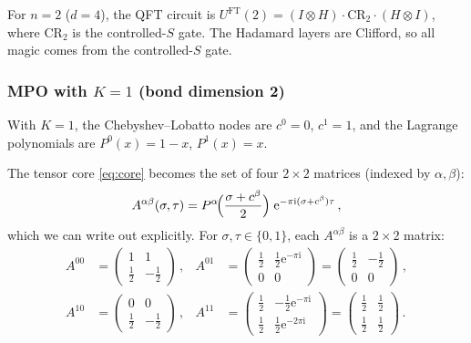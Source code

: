 \documentclass[11pt,a4paper]{article}
\theoremstyle{definition}
\theoremstyle{remark}
\newcommand{\UFT}{U^{\mathrm{FT}}}
\newcommand{\ee}{\mathrm{e}}
\newcommand{\ii}{\mathrm{i}}
\begin{document}
For $n=2$ ($d=4$), the QFT circuit is $\UFT(2) = (I\otimes H)\cdot \mathrm{CR}_2 \cdot (H\otimes I)$, where $\mathrm{CR}_2$ is the controlled-$S$ gate.  The Hadamard layers are Clifford, so all magic comes from the controlled-$S$ gate.

\subsubsection{MPO with $K=1$ (bond dimension 2)}

With $K=1$, the Chebyshev--Lobatto nodes are $c^0=0$, $c^1=1$, and the Lagrange polynomials are $P^0(x)=1-x$, $P^1(x)=x$.

The tensor core \eqref{eq:core} becomes the set of four $2\times 2$ matrices (indexed by $\alpha,\beta$):
\begin{equation}\label{eq:core_K1}
  A^{\alpha\beta}(\sigma,\tau) = P^\alpha\!\Bigl(\frac{\sigma+c^\beta}{2}\Bigr)
  \;\ee^{-\pi\ii(\sigma+c^\beta)\tau}\,,
\end{equation}
which we can write out explicitly. For $\sigma,\tau\in\{0,1\}$, each $A^{\alpha\beta}$ is a $2\times 2$ matrix:
\begin{align}
  A^{00} &= \begin{pmatrix} 1 & 1 \\ \tfrac{1}{2} & -\tfrac{1}{2}\end{pmatrix}\,,
  &
  A^{01} &= \begin{pmatrix} \tfrac{1}{2} & \tfrac{1}{2}\ee^{-\pi\ii}\\[2pt] 0 & 0\end{pmatrix}
  = \begin{pmatrix} \tfrac{1}{2} & -\tfrac{1}{2}\\[2pt] 0 & 0\end{pmatrix}\,,\\[6pt]
  A^{10} &= \begin{pmatrix} 0 & 0\\[2pt] \tfrac{1}{2} & -\tfrac{1}{2}\end{pmatrix}\,,
  &
  A^{11} &= \begin{pmatrix} \tfrac{1}{2} & -\tfrac{1}{2}\ee^{-\pi\ii}\\[2pt]
  \tfrac{1}{2} & \tfrac{1}{2}\ee^{-2\pi\ii}\end{pmatrix}
  = \begin{pmatrix} \tfrac{1}{2} & \tfrac{1}{2}\\[2pt] \tfrac{1}{2} & \tfrac{1}{2}\end{pmatrix}\,.
\end{align}
\end{document}
